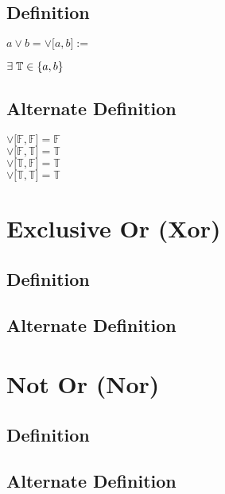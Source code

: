 \documentclass[11pt]{article}
\begin{document}
\subsection{Definition}
\begin{center}
$
a \lor b = \lor \lbrack{a,b}\rbrack :=
$
\end{center}
\begin{center}
$
\exists \hspace{1mm} \mathbb{T} \in \{a,b\}
$
\end{center}



\subsection{Alternate Definition}
\begin{center}
$\lor \lbrack\mathbb{F}, \mathbb{F}\rbrack = \mathbb{F}$ \\
$\lor \lbrack\mathbb{F}, \mathbb{T}\rbrack = \mathbb{T}$ \\
$\lor \lbrack\mathbb{T}, \mathbb{F}\rbrack = \mathbb{T}$ \\
$\lor \lbrack\mathbb{T}, \mathbb{T}\rbrack = \mathbb{T}$ \\
\end{center}






\section{Exclusive Or (Xor)}
\subsection{Definition}
\subsection{Alternate Definition}







\section{Not Or (Nor)}
\subsection{Definition}
\subsection{Alternate Definition}
\end{document}
